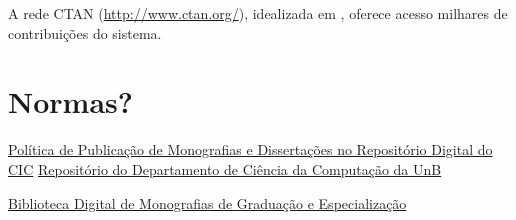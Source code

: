 A rede CTAN (\url{http://www.ctan.org/}), idealizada em \cite{greenwade93}, oferece
acesso milhares de contribuições do sistema.%

\section{Normas?} 
\href{http://monografias.cic.unb.br/dspace/normasGerais.pdf}{Política de Publicação de Monografias e Dissertações no Repositório Digital do CIC}%
\href{http://monografias.cic.unb.br/dspace/}{Repositório do Departamento de Ciência da Computação da UnB}

\href{http://bdm.bce.unb.br/}{Biblioteca Digital de Monografias de Graduação e Especialização}